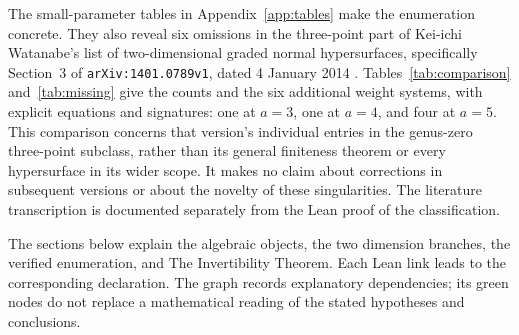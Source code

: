 The small-parameter tables in Appendix~\ref{app:tables} make the enumeration concrete. They also reveal six omissions in the three-point part of Kei-ichi Watanabe's list of two-dimensional graded normal hypersurfaces, specifically Section~3 of \texttt{arXiv:1401.0789v1}, dated 4 January 2014 \cite{Watanabe}. Tables~\ref{tab:comparison} and~\ref{tab:missing} give the counts and the six additional weight systems, with explicit equations and signatures: one at $a=3$, one at $a=4$, and four at $a=5$. This comparison concerns that version's individual entries in the genus-zero three-point subclass, rather than its general finiteness theorem or every hypersurface in its wider scope. It makes no claim about corrections in subsequent versions or about the novelty of these singularities. The literature transcription is documented separately from the Lean proof of the classification.

The sections below explain the algebraic objects, the two dimension branches, the verified enumeration, and The Invertibility Theorem. Each Lean link leads to the corresponding declaration. The graph records explanatory dependencies; its green nodes do not replace a mathematical reading of the stated hypotheses and conclusions.
